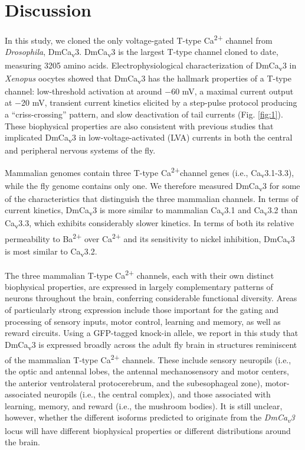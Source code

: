 \section*{Discussion}

In this study, we cloned the only voltage-gated T-type Ca\textsuperscript{2+} channel from \emph{Drosophila}, DmCa\textsubscript{v}3.
DmCa\textsubscript{v}3 is the largest T-type channel cloned to date, measuring 3205 amino acids\cite{senatore:2010aa}.
Electrophysiological characterization of DmCa\textsubscript{v}3 in \emph{Xenopus} oocytes showed that DmCa\textsubscript{v}3 has the hallmark properties of a T-type channel: low-threshold activation at around $-$60 mV, a maximal current output at $-$20 mV, transient current kinetics elicited by a step-pulse protocol producing a ``criss-crossing'' pattern, and slow deactivation of tail currents (Fig. \ref{fig:1}).
These biophysical properties are also consistent with previous studies that implicated DmCa\textsubscript{v}3 in low-voltage-activated (LVA) currents in both the central and peripheral nervous systems of the fly\cite{Ryglewski:2012jk, Iniguez:2013ib}.

Mammalian genomes contain three T-type Ca\textsuperscript{2+}channel genes (i.e., Ca\textsubscript{v}3.1-3.3), while the fly genome contains only one.
We therefore measured DmCa\textsubscript{v}3 for some of the characteristics that distinguish the three mammalian channels.
In terms of current kinetics, DmCa\textsubscript{v}3 is more similar to mammalian Ca\textsubscript{v}3.1 and Ca\textsubscript{v}3.2 than Ca\textsubscript{v}3.3, which exhibits considerably  slower kinetics.
In terms of both its relative permeability to Ba\textsuperscript{2+} over Ca\textsuperscript{2+} and its sensitivity to nickel inhibition, DmCa\textsubscript{v}3 is most similar to Ca\textsubscript{v}3.2\cite{kang:2006aa, park:2013aa}.

The three mammalian T-type Ca\textsuperscript{2+} channels,  each with their own distinct biophysical properties, are expressed in largely complementary patterns of neurons throughout the brain, conferring considerable functional diversity. Areas of particularly strong expression include those important for the gating and processing of sensory inputs, motor control, learning and memory, as well as reward circuits\cite{talley:1999aa}. 
Using a GFP-tagged knock-in allele, we report in this study that DmCa\textsubscript{v}3 is expressed broadly across the adult fly brain in structures reminiscent of the mammalian T-type Ca\textsuperscript{2+} channels.
These include sensory neuropils (i.e., the optic and antennal lobes, the antennal mechanosensory and motor centers, the anterior ventrolateral protocerebrum, and the subesophageal zone), motor-associated neuropils (i.e., the central complex), and those associated with learning, memory, and reward (i.e., the mushroom bodies).
It is still unclear, however, whether the different isoforms predicted to originate from the \emph{DmCa\textsubscript{v}3} locus will have different biophysical properties or different distributions around the brain. 

